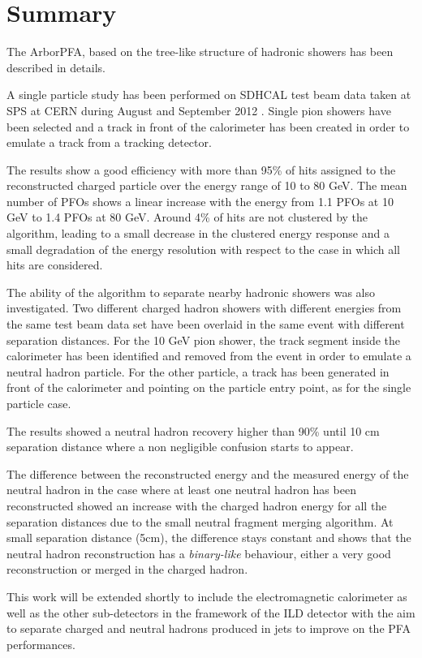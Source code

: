 \documentclass[cits]{JINST}
\begin{document}
\section{Summary}

The ArborPFA, based on the tree-like structure of hadronic showers has been described in details. 

A single particle study has been performed on SDHCAL test beam data taken at SPS at CERN during August and September 2012 \cite{sdhcal-paper}. Single pion showers have been selected and a track in front of the calorimeter has been created in order to emulate a track from a tracking detector.

The results show a good efficiency with more than 95\% of hits assigned to the reconstructed charged particle over the energy range of 10 to 80 GeV. The mean number of PFOs shows a linear increase with the energy from 1.1 PFOs at 10 GeV to 1.4 PFOs at 80 GeV. Around 4\% of hits are not clustered by the algorithm, leading to a small decrease in the clustered energy response and a small degradation of the energy resolution with respect to the case in which all hits are considered.

The ability of the algorithm to separate nearby hadronic showers was also investigated. Two different charged hadron showers with different energies from the same test beam data set have been overlaid in the same event with different separation distances. For the 10 GeV pion shower, the track segment inside the calorimeter has been identified and removed from the event in order to emulate a neutral hadron particle. For the other particle, a track has been generated in front of the calorimeter and pointing on the particle entry point, as for the single particle case. 

The results showed a neutral hadron recovery higher than 90\% until 10 cm separation distance where a non negligible confusion starts to appear. 

The difference between the reconstructed energy and the measured energy of the neutral hadron in the case where at least one neutral hadron has been reconstructed showed an increase with the charged hadron energy for all the separation distances due to the small neutral fragment merging algorithm. At small separation distance (5cm), the difference stays constant and shows that the neutral hadron reconstruction has a \textit{binary-like} behaviour, either a very good reconstruction or merged in the charged hadron.

This work will be extended shortly to include the electromagnetic calorimeter as well as the other sub-detectors in the framework of the ILD detector with the aim to separate charged and neutral hadrons produced in jets to improve on the PFA performances.
\end{document}
